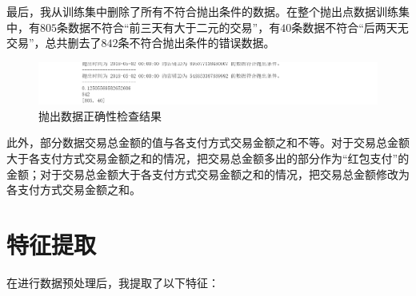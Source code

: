 \documentclass{article}
\begin{document}
最后，我从训练集中删除了所有不符合抛出条件的数据。在整个抛出点数据训练集中，有$805$条数据不符合“前三天有⼤于二元的交易”，有$40$条数据不符合“后两天⽆交易”，总共删去了$842$条不符合抛出条件的错误数据。

\begin{figure}[h]
    \centering
    \includegraphics[width=0.75\linewidth]{img/image02.png}
    \caption{抛出数据正确性检查结果}
    \label{fig:enter-label}
\end{figure}

此外，部分数据交易总金额的值与各支付方式交易金额之和不等。对于交易总金额大于各支付方式交易金额之和的情况，把交易总金额多出的部分作为“红包支付”的金额；对于交易总金额大于各支付方式交易金额之和的情况，把交易总金额修改为各支付方式交易金额之和。

\section{特征提取}
在进行数据预处理后，我提取了以下特征：
\end{document}
